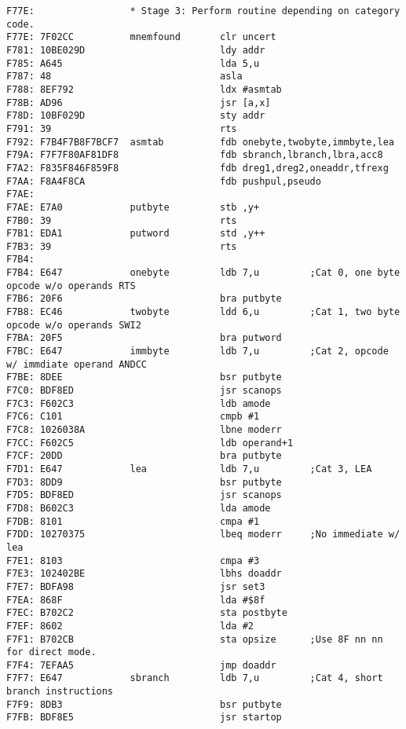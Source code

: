 {\begin{verbatim}
F77E:                 * Stage 3: Perform routine depending on category code.
F77E: 7F02CC          mnemfound       clr uncert
F781: 10BE029D                        ldy addr
F785: A645                            lda 5,u
F787: 48                              asla
F788: 8EF792                          ldx #asmtab
F78B: AD96                            jsr [a,x]
F78D: 10BF029D                        sty addr
F791: 39                              rts
F792: F7B4F7B8F7BCF7  asmtab          fdb onebyte,twobyte,immbyte,lea
F79A: F7F7F80AF81DF8                  fdb sbranch,lbranch,lbra,acc8
F7A2: F835F846F859F8                  fdb dreg1,dreg2,oneaddr,tfrexg
F7AA: F8A4F8CA                        fdb pushpul,pseudo
F7AE:                 
F7AE: E7A0            putbyte         stb ,y+
F7B0: 39                              rts
F7B1: EDA1            putword         std ,y++
F7B3: 39                              rts
F7B4:                 
F7B4: E647            onebyte         ldb 7,u         ;Cat 0, one byte opcode w/o operands RTS
F7B6: 20F6                            bra putbyte
F7B8: EC46            twobyte         ldd 6,u         ;Cat 1, two byte opcode w/o operands SWI2
F7BA: 20F5                            bra putword
F7BC: E647            immbyte         ldb 7,u         ;Cat 2, opcode w/ immdiate operand ANDCC
F7BE: 8DEE                            bsr putbyte
F7C0: BDF8ED                          jsr scanops
F7C3: F602C3                          ldb amode
F7C6: C101                            cmpb #1
F7C8: 1026038A                        lbne moderr
F7CC: F602C5                          ldb operand+1
F7CF: 20DD                            bra putbyte
F7D1: E647            lea             ldb 7,u         ;Cat 3, LEA
F7D3: 8DD9                            bsr putbyte
F7D5: BDF8ED                          jsr scanops
F7D8: B602C3                          lda amode
F7DB: 8101                            cmpa #1
F7DD: 10270375                        lbeq moderr     ;No immediate w/ lea
F7E1: 8103                            cmpa #3
F7E3: 102402BE                        lbhs doaddr     
F7E7: BDFA98                          jsr set3
F7EA: 868F                            lda #$8f
F7EC: B702C2                          sta postbyte
F7EF: 8602                            lda #2
F7F1: B702CB                          sta opsize      ;Use 8F nn nn for direct mode.  
F7F4: 7EFAA5                          jmp doaddr
F7F7: E647            sbranch         ldb 7,u         ;Cat 4, short branch instructions
F7F9: 8DB3                            bsr putbyte
F7FB: BDF8E5                          jsr startop

\end{verbatim}}
